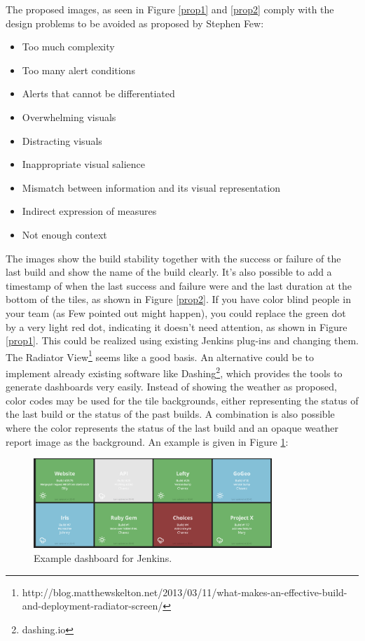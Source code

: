 \documentclass[10pt,a4paper]{article}
\begin{document}
\begin{appendices}
The proposed images, as seen in Figure \ref{prop1} and \ref{prop2} comply with the design problems to be avoided as proposed by Stephen Few:
\begin{itemize}
\item Too much complexity
\item Too many alert conditions
\item Alerts that cannot be differentiated
\item Overwhelming visuals
\item Distracting visuals
\item Inappropriate visual salience
\item Mismatch between information and its visual representation
\item Indirect expression of measures
\item Not enough context
\end{itemize}
The images show the build stability together with the success or failure of the last build and show the name of the build clearly. It's also possible to add a timestamp of when the last success and failure were and the last duration at the bottom of the tiles, as shown in Figure \ref{prop2}. If you have color blind people in your team (as Few pointed out might happen), you could replace the green dot by a very light red dot, indicating it doesn't need attention, as shown in Figure \ref{prop1}.
This could be realized using existing Jenkins plug-ins and changing them. The Radiator View\footnote{http://blog.matthewskelton.net/2013/03/11/what-makes-an-effective-build-and-deployment-radiator-screen/} seems like a good basis.
An alternative could be to implement already existing software like Dashing\footnote{dashing.io}, which provides the tools to generate dashboards very easily. Instead of showing the weather as proposed, color codes may be used for the tile backgrounds, either representing the status of the last build or the status of the past builds. A combination is also possible where the color represents the status of the last build and an opaque weather report image as the background. An example is given in Figure \ref{dash}:

\begin{figure}[ht!]
\centering
\includegraphics[width=90mm]{dashboard-prop.png}
\caption{Example dashboard for Jenkins.} 
\label{dash}
\end{figure} 
 

\end{appendices}
\end{document}
